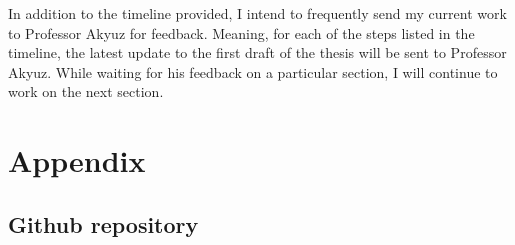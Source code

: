 \documentclass[a4paper,11pt]{article}
\begin{document}
\begin{landscape}
	
	In addition to the timeline provided, I intend to frequently send my current work to Professor Akyuz for feedback. Meaning, for each of the steps listed in the timeline, the latest update to the first draft of the thesis will be sent to Professor Akyuz. While waiting for his feedback on a particular section, I will continue to work on the next section.
\end{landscape}




\newpage
 
 

\newpage
\appendix
\section{Appendix}
\subsection{Github repository}
\end{document}
